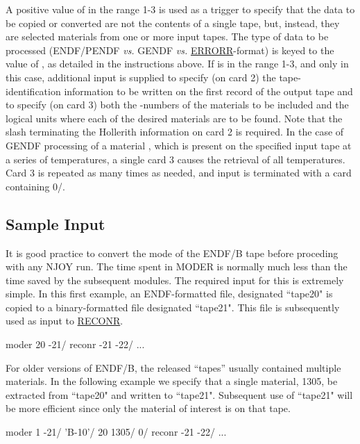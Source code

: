 A positive value of  in the range 1-3 is used as a
trigger to specify that the data to be copied or converted are not
the contents of a single tape, but, instead, they are selected materials
from one or more input tapes.  The type of data to be processed
(ENDF/PENDF {\it vs.} GENDF {\it vs.}
\hyperlink{sERRORRhy}{ERRORR}-format) is keyed to the value of
, as detailed in the instructions above.  If 
is in the range 1-3, and only in this case, additional input is
supplied to specify (on card 2) the tape-identification information
to be written on the first record of the output tape and to specify
(on card 3) both the -numbers of the materials to be included and
the logical units where each of the desired materials are to
be found.  Note that the slash terminating the Hollerith information
on card 2 is required. In the case of GENDF processing of a material
, which is present on the specified input tape at a series of
temperatures, a single card 3
causes the retrieval of all temperatures.
Card 3 is repeated as many times as needed, and input is terminated
with a card containing 0/.

\subsection{Sample Input}
\label{ssMODER_sampleinp}

It is good practice to convert the mode of the ENDF/B tape before
proceding with any NJOY run.  The time spent in MODER is normally
much less than the time saved by the subsequent modules.  The required
input for this is extremely simple.  In this first example, an ENDF-formatted
file, designated ``tape20" is copied to a binary-formatted file designated
``tape21".  This file is subsequently used as input to
\hyperlink{sRECONRhy}{RECONR}.

\small
\begin{ccode}

   moder
   20 -21/
   reconr
   -21 -22/
   ...

\end{ccode}
\normalsize

For older versions of ENDF/B, the released ``tapes'' usually
contained multiple materials.  In the following example we specify
that a single material, 1305, be extracted from ``tape20" and
written to ``tape21".  Subsequent use of ``tape21" will be more
efficient since only the material of interest is on that tape.

\small
\begin{ccode}

   moder
   1 -21/
   'B-10'/
   20 1305/
   0/
   reconr
   -21 -22/
   ...

\end{ccode}
\normalsize

